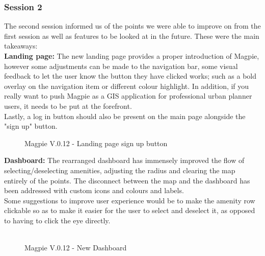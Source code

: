 \newpage
\subsubsection{Session 2}
The second session informed us of the points we were able to improve on from the first session as well as features to be looked at in the future. These were the main takeaways:\\

\textbf{Landing page: }
The new landing page provides a proper introduction of Magpie, however some adjustments can be made to the navigation bar, some visual feedback to let the user know the button they have clicked works; such as a bold overlay on the navigation item or different colour highlight. In addition, if you really want to push Magpie as a GIS application for professional urban planner users, it needs to be put at the forefront.\\
Lastly, a log in button should also be present on the main page alongside the "sign up" button.\\
\begin{figure}[h!]
    \centering
    \caption{Magpie V.0.12 - Landing page sign up button}
\end{figure}

\noindent \textbf{Dashboard: }
The rearranged dashboard has immensely improved the flow of selecting/deselecting amenities, adjusting the radius and clearing the map entirely of the points. The disconnect between the map and the dashboard has been addressed with custom icons and colours and labels.\\
Some suggestions to improve user experience would be to make the amenity row clickable so as to make it easier for the user to select and deselect it, as opposed to having to click the eye directly.\\\\
\begin{figure}[h!]
    \centering
    \caption{Magpie V.0.12 - New Dashboard}
\end{figure}

